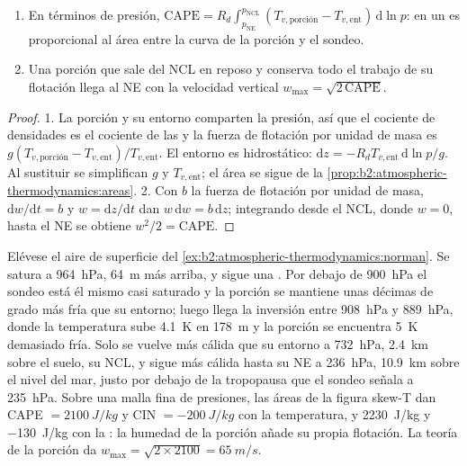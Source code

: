 \begin{proposition}\label{prop:b2:atmospheric-thermodynamics:buoyancy}
\begin{enumerate}
  \item En términos de presión, $\text{CAPE} = R_d \int_{p_{\text{NE}}}^{p_{\text{NCL}}}
        (T_{v,\text{porción}} - T_{v,\text{ent}})\,\mathrm{d}\ln p$: en un  es
        proporcional al área entre la curva de la porción y el sondeo.
  \item Una porción que sale del NCL en reposo y conserva todo el trabajo de su flotación llega al
        NE con la velocidad vertical $w_{\max} = \sqrt{2\,\text{CAPE}}$.
\end{enumerate}
\end{proposition}

\begin{proof}
1. La porción y su entorno comparten la presión, así que el cociente de densidades es el cociente de las
 y la fuerza de flotación por unidad de masa es
$g(T_{v,\text{porción}} - T_{v,\text{ent}})/T_{v,\text{ent}}$. El entorno es hidrostático:
$\mathrm{d}z = -R_dT_{v,\text{ent}}\,\mathrm{d}\ln p/g$. Al sustituir se simplifican $g$ y
$T_{v,\text{ent}}$; el área se sigue de la \cref{prop:b2:atmospheric-thermodynamics:areas}.
2. Con $b$ la fuerza de flotación por unidad de masa, $\mathrm{d}w/\mathrm{d}t = b$ y $w = \mathrm{d}z/
\mathrm{d}t$ dan $w\,\mathrm{d}w = b\,\mathrm{d}z$; integrando desde el NCL, donde $w = 0$, hasta
el NE se obtiene $w^2/2 = \text{CAPE}$.
\end{proof}

\begin{example}\label{ex:b2:atmospheric-thermodynamics:cape}
Elévese el aire de superficie del \cref{ex:b2:atmospheric-thermodynamics:norman}. Se satura a
\qty{964}{hPa}, \qty{64}{m} más arriba, y sigue una . Por debajo de \qty{900}{hPa} el sondeo está
él mismo casi saturado y la porción se mantiene unas décimas de grado más fría que su
entorno; luego llega la inversión entre \qty{908}{hPa} y \qty{889}{hPa}, donde la
temperatura sube \qty{4.1}{K} en \qty{178}{m} y la porción se encuentra \qty{5}{K} demasiado
fría. Solo se vuelve más cálida que su entorno a \qty{732}{hPa}, \qty{2.4}{km} sobre el
suelo, su NCL, y sigue más cálida hasta su NE a \qty{236}{hPa}, \qty{10.9}{km} sobre el nivel del mar,
justo por debajo de la tropopausa que el sondeo señala a \qty{235}{hPa}. Sobre una malla fina de presiones, las
áreas de la figura skew-T dan CAPE $= \qty{2100}{J/kg}$ y CIN $= \qty{-200}{J/kg}$ con la
temperatura, y \qty{2230}{J/kg} y \qty{-130}{J/kg} con la : la humedad
de la porción añade su propia flotación. La teoría de la porción da $w_{\max} = \sqrt{2 \times 2100} =
\qty{65}{m/s}$.
\end{example}

